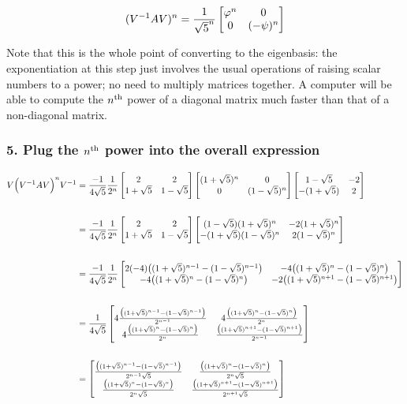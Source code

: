 \begin{align*}
(V^{-1}AV)^n = \frac{1}{\sqrt{5}^n} \begin{bmatrix}\varphi^n & 0    \\0  & (-\psi)^n\\ \end{bmatrix}
\end{align*}

Note that this is the whole point of converting to the eigenbasis: the exponentiation at this step
just involves the usual operations of raising scalar numbers to a power; no need to multiply
matrices together. A computer will be able to compute the $n^{\text{th}}$ power of a diagonal matrix much
faster than that of a non-diagonal matrix.



\subsubsection{5. Plug the $n^{\text{th}}$ power into the overall expression}

\begin{align*}
V \Big(V^{-1}AV\Big)^n V^{-1}
&=
\frac{-1}{4\sqrt 5}
\frac{1}{2^n}
\begin{bmatrix}2           & 2          \\1 + \sqrt 5 & 1 - \sqrt 5\\ \end{bmatrix}
\begin{bmatrix}(1 + \sqrt 5)^n & 0              \\0               & (1 - \sqrt 5)^n\\ \end{bmatrix}
\begin{bmatrix}1 - \sqrt 5  & -2\\-(1 + \sqrt 5) & 2\\ \end{bmatrix}
\\\\
&=
\frac{-1}{4\sqrt 5}
\frac{1}{2^n}
\begin{bmatrix}2           & 2          \\1 + \sqrt 5 & 1 - \sqrt 5\\ \end{bmatrix}
\begin{bmatrix}(1 - \sqrt 5)(1 + \sqrt 5)^n & -2(1 + \sqrt 5)^n\\-(1 + \sqrt 5)(1 - \sqrt 5)^n & 2(1 - \sqrt 5)^n\\ \end{bmatrix}
\\\\
&=
\frac{-1}{4\sqrt 5}
\frac{1}{2^n}
\begin{bmatrix}2(-4)\big((1 + \sqrt 5)^{n-1} - (1 - \sqrt 5)^{n-1}\big) & -4\big((1 + \sqrt 5)^n     - (1 - \sqrt 5)^n    \big)\\   -4\big((1 + \sqrt 5)^n     - (1 - \sqrt 5)^n    \big) & -2\big((1 + \sqrt 5)^{n+1} - (1 - \sqrt 5)^{n+1}\big)\\ \end{bmatrix}
\\\\
&=
\frac{1}{4\sqrt 5}
\begin{bmatrix}4\frac{\big((1 + \sqrt 5)^{n-1} - (1 - \sqrt 5)^{n-1}\big)}{2^{n-1}} & 4\frac{\big((1 + \sqrt 5)^n     - (1 - \sqrt 5)^n    \big)}{2^n    }\\4\frac{\big((1 + \sqrt 5)^n     - (1 - \sqrt 5)^n    \big)}{2^n    } &  \frac{\big((1 + \sqrt 5)^{n+1} - (1 - \sqrt 5)^{n+1}\big)}{2^{n-1}}\\ \end{bmatrix}
\\\\
&=
\begin{bmatrix}\frac{\big((1 + \sqrt 5)^{n-1} - (1 - \sqrt 5)^{n-1}\big)}{2^{n-1}\sqrt 5} & \frac{\big((1 + \sqrt 5)^n     - (1 - \sqrt 5)^n    \big)}{2^n    \sqrt 5}\\\frac{\big((1 + \sqrt 5)^n     - (1 - \sqrt 5)^n    \big)}{2^n    \sqrt 5} & \frac{\big((1 + \sqrt 5)^{n+1} - (1 - \sqrt 5)^{n+1}\big)}{2^{n+1}\sqrt 5}\\ \end{bmatrix}
\end{align*}


